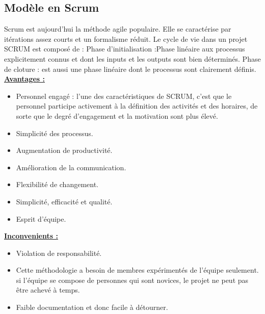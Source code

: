 \documentclass[11pt,a4paper,oneside]{book}
\begin{document}
	\subsection{Modèle en Scrum}
	Scrum est aujourd’hui la méthode agile populaire. Elle se caractérise par itérations assez courts et un formalisme réduit.
	Le cycle de vie dans un projet SCRUM est composé de :
	Phase d’initialisation :Phase linéaire aux processus explicitement connus et dont les inputs
	et les outputs sont bien déterminés.
	Phase de cloture : est aussi une phase linéaire dont le processus sont clairement définis.\\
	\underline{\textbf{Avantages :}}
	\begin{itemize}
		\item Personnel engagé : l’une des caractéristiques de SCRUM, c’est que le personnel participe
		activement à la définition des activités et des horaires, de sorte que le degré d’engagement
		et la motivation sont plus élevé.
		\item Simplicité des processus.
		\item Augmentation de productivité.
		\item Amélioration de la communication.
		\item Flexibilité de changement.
		\item Simplicité, efficacité et qualité.
		\item Esprit d’équipe.
	\end{itemize}
	\underline{\textbf{Inconvenients :}}
	\begin{itemize}
		\item Violation de responsabilité.
		\item Cette méthodologie a besoin de membres expérimentés de l’équipe seulement. si l’équipe se compose de personnes qui sont novices, le projet ne peut pas être achevé à temps.
		\item Faible documentation et donc facile à détourner.
	\end{itemize}
\end{document}
